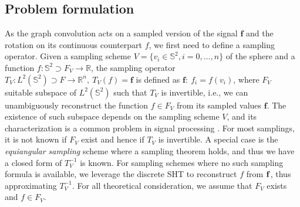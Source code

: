 \documentclass{article} %
\renewcommand{\b}[1]{{\bm{#1}}}   %
\begin{document}
\subsection{Problem formulation} 
As the graph convolution acts on a sampled version of the signal $\b{f}$ and the rotation on its continuous counterpart $f$, we first need to define a sampling operator.
Given a sampling scheme $V=\{v_i\in\mathbb S^2, i=0, \dots, n\}$ of the sphere and a function $f : \mathbb S^2 \supset F_V \to \mathbb R$, the sampling operator $T_V: L^2(\mathbb S^2) \supset F\to \mathbb R^n,\  T_V(f) = \b{f}$ is defined as $\b{f}:\ f_i=f(v_i)$, where $F_V$ suitable subspace of $L^2(\mathbb S^2)$ such that $T_V$ is invertible, i.e., we can unambiguously reconstruct the function $f\in F_V$ from its sampled values $\b{f}$.
The existence of such subspace depends on the sampling scheme $V$, and its characterization is a common problem in signal processing \cite{driscoll1994Fouriersphere}.
For most samplings, it is not known if $F_V$ exist and hence if $T_V$ is invertible. A special case is the \textit{equiangular sampling} scheme where a sampling theorem holds, and thus we have a closed form of $T_V^{-1}$ is known. %
For sampling schemes where no such sampling formula is available, we leverage the discrete SHT to reconstruct $f$ from $\bf{f}$, thus approximating $T_V^{-1}$.
For all theoretical consideration, we assume that $F_V$ exists and $f \in F_V$.
\end{document}
